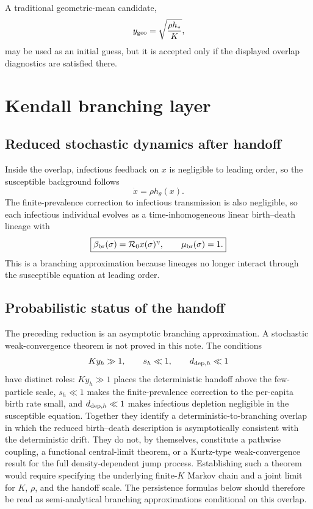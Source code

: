 \documentclass[11pt]{article}
\newcommand{\Rzero}{\mathcal R_0}
\newcommand{\hth}{h_\theta}
\begin{document}
A traditional geometric-mean candidate,
\[
y_{\rm geo}=\sqrt{\frac{\rho h_*}{K}},
\]
may be used as an initial guess, but it is accepted only if the displayed overlap diagnostics are satisfied there.

\section{Kendall branching layer}
\label{sec:kendall}

\subsection{Reduced stochastic dynamics after handoff}
Inside the overlap, infectious feedback on $x$ is negligible to leading order, so the susceptible background follows
\[
\boxed{\dot x=\rho\hth(x).}
\]
The finite-prevalence correction to infectious transmission is also negligible, so each infectious individual evolves as a time-inhomogeneous linear birth--death lineage with
\[
\boxed{
\beta_{\rm br}(\sigma)=\Rzero x(\sigma)^\eta,
\qquad
\mu_{\rm br}(\sigma)=1.}
\]
This is a branching approximation because lineages no longer interact through the susceptible equation at leading order.

\subsection{Probabilistic status of the handoff}
The preceding reduction is an asymptotic branching approximation. A stochastic weak-convergence theorem is not proved in this note. The conditions
\[
Ky_h\gg1,
\qquad
s_h\ll1,
\qquad
d_{{\rm dep},h}\ll1
\]
have distinct roles: $Ky_h\gg1$ places the deterministic handoff above the few-particle scale, $s_h\ll1$ makes the finite-prevalence correction to the per-capita birth rate small, and $d_{{\rm dep},h}\ll1$ makes infectious depletion negligible in the susceptible equation. Together they identify a deterministic-to-branching overlap in which the reduced birth--death description is asymptotically consistent with the deterministic drift. They do not, by themselves, constitute a pathwise coupling, a functional central-limit theorem, or a Kurtz-type weak-convergence result for the full density-dependent jump process. Establishing such a theorem would require specifying the underlying finite-$K$ Markov chain and a joint limit for $K$, $\rho$, and the handoff scale. The persistence formulas below should therefore be read as semi-analytical branching approximations conditional on this overlap.
\end{document}
